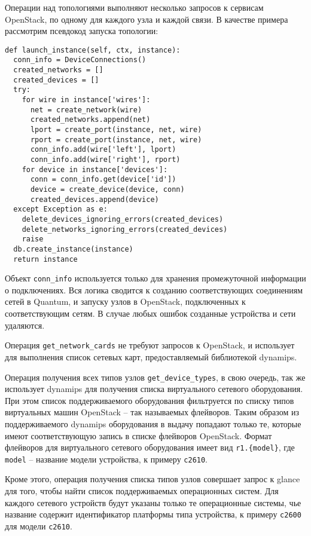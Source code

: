 Операции над топологиями выполняют несколько запросов к сервисам OpenStack, по одному для 
каждого узла и каждой связи.
В качестве примера рассмотрим псевдокод запуска топологии:
\begin{lstlisting}
def launch_instance(self, ctx, instance):
  conn_info = DeviceConnections()
  created_networks = []
  created_devices = []
  try:
    for wire in instance['wires']:
      net = create_network(wire)
      created_networks.append(net)
      lport = create_port(instance, net, wire)
      rport = create_port(instance, net, wire)
      conn_info.add(wire['left'], lport)
      conn_info.add(wire['right'], rport)
    for device in instance['devices']:
      conn = conn_info.get(device['id'])
      device = create_device(device, conn)
      created_devices.append(device)
  except Exception as e:
    delete_devices_ignoring_errors(created_devices)
    delete_networks_ignoring_errors(created_devices)
    raise
  db.create_instance(instance)
  return instance
\end{lstlisting}
Объект \verb`conn_info` используется только для хранения промежуточной информации о 
подключениях.
Вся логика сводится к созданию соответствующих соединениям сетей в Quantum, и запуску
узлов в OpenStack, подключенных к соответствующим сетям. В случае любых ошибок
созданные устройства и сети удаляются.

Операция \verb`get_network_cards` не требуют запросов к OpenStack, и использует для выполнения 
список сетевых карт, предоставляемый библиотекой dynamips. 

Операция получения всех типов узлов \verb`get_device_types`, в свою очередь,
так же использует dynamips для получения списка виртуального сетевого оборудования.
При этом список поддерживаемого оборудования фильтруется по списку типов виртуальных
машин OpenStack -- так называемых флейворов. Таким образом из поддерживаемого
dynamips оборудования в выдачу попадают только те, которые имеют соответствующую запись
в списке флейворов OpenStack. Формат флейворов для виртуального сетевого оборудования 
имеет вид \verb`r1.{model}`, где \verb`model` -- название модели устройства, к примеру 
\verb`c2610`.

Кроме этого, операция получения списка типов узлов совершает запрос к glance для того, чтобы 
найти список поддерживаемых операционных систем. Для каждого сетевого устройств будут указаны
только те операционные системы, чье название содержит идентификатор платформы
типа устройства, к примеру \verb`c2600` для модели \verb`c2610`.


